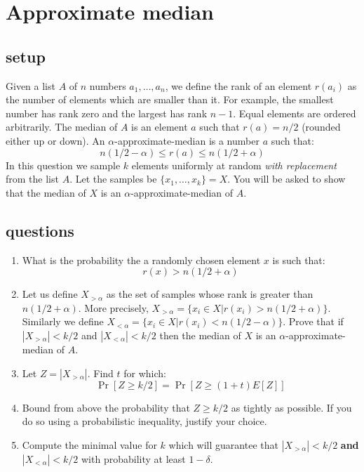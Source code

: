 \section{Approximate median}
\subsection*{setup}
Given a list $A$ of $n$ numbers $a_1,\ldots,a_n$, we define the rank
of an element $r(a_i)$ as the number of elements which are smaller
than it. For example, the smallest number has rank zero and the
largest has rank $n-1$. Equal elements are ordered arbitrarily. The
median of $A$ is an element $a$ such that $r(a) = n/2$ (rounded
either up or down). An $\alpha$-approximate-median is a number $a$
such that:
\[
n(1/2 - \alpha) \le r(a) \le n(1/2 + \alpha)
\]
In this question we sample $k$ elements uniformly at random {\it
with replacement} from the list $A$. Let the samples be
$\{x_1,\ldots,x_k\} = X$. You will be asked to show that the median of
$X$ is an $\alpha$-approximate-median of $A$.

\subsection*{questions}
\begin{enumerate}
\item What is the probability the a randomly chosen element $x$ is
such that:
\[
r(x) > n(1/2 + \alpha)
\]
\item Let us define $X_{>\alpha}$ as the set of samples whose rank
is greater than $n(1/2 + \alpha)$. More precisely, $X_{>\alpha} =
\{x_i \in X | r(x_i) > n(1/2 + \alpha)\}$. Similarly we define
$X_{<\alpha} = \{x_i \in X | r(x_i) < n(1/2 - \alpha)\}$. Prove that
if $|X_{>\alpha}| < k/2$ and $|X_{<\alpha}| < k/2$ then the median
of $X$ is an $\alpha$-approximate-median of $A$.
\item Let $Z = |X_{>\alpha}|$. Find $t$ for which:
\[
\Pr[Z \ge k/2] = \Pr[Z \ge (1+t)E[Z]]
\]
\item Bound from above the probability that $Z \ge k/2$ as tightly
as possible. If you do so using a probabilistic inequality, justify
your choice.
\item Compute the minimal value for $k$ which will guarantee that
$|X_{>\alpha}| < k/2$ {\bf and} $|X_{<\alpha}| < k/2$ with
probability at least $1-\delta$.
\end{enumerate}
\pagebreak


